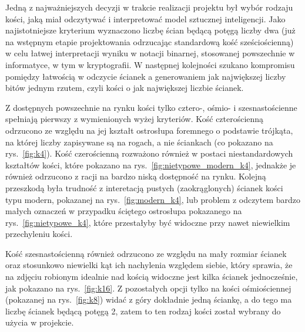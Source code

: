 Jedną z najważniejszych decyzji w trakcie realizacji projektu był wybór rodzaju kości, jaką miał odczytywać
i interpretować model sztucznej inteligencji.
Jako najistotniejsze kryterium wyznaczono liczbę ścian będącą potęgą liczby dwa
(już na wstępnym etapie projektowania odrzucając standardową kość sześciościenną)
w celu łatwej interpretacji wyniku w notacji binarnej, stosowanej powszechnie w informatyce, w tym w kryptografii.
W następnej kolejności szukano kompromisu pomiędzy łatwością w odczycie ścianek a generowaniem jak największej liczby
bitów jednym rzutem, czyli kości o jak największej liczbie ścianek.

Z dostępnych powszechnie na rynku kości tylko cztero-, ośmio- i szesnastościenne spełniają pierwszy z wymienionych wyżej kryteriów.
Kość czterościenną odrzucono ze względu na jej kształt ostrosłupa foremnego o podstawie trójkąta,
na której liczby zapisywane są na rogach, a nie ściankach (co pokazano na rys.~\ref{fig:k4}).
Kość czerościenną rozważono również w postaci niestandardowych kształtów kości, które pokazano na rys.~\ref{fig:nietypowe_modern_k4},
jednakże je również odrzucono z racji na bardzo niską dostępność na rynku. Kolejną przeszkodą była trudność 
z interetacją pustych (zaokrąglonych) ścianek kości typu modern, pokazanej na rys.~\ref{fig:modern_k4},
lub problem z odczytem bardzo małych oznaczeń w przypadku ściętego ostrosłupa pokazanego na rys.~\ref{fig:nietypowe_k4}, 
które przestałyby być widoczne przy nawet niewielkim przechyleniu kości.

Kość szesnastościenną również odrzucono ze względu na mały rozmiar ścianek oraz stosunkowo niewielki kąt ich nachylenia względem siebie,
który sprawia, że na zdjęciu robionym idealnie nad kością widoczne jest kilka ścianek jednocześnie, jak pokazano na rys.~\ref{fig:k16}.
Z pozostałych opcji tylko na kości ośmiościennej (pokazanej na rys.~\ref{fig:k8}) widać z góry dokładnie jedną ściankę,
a do tego ma liczbę ścianek będącą potęgą 2, zatem to ten rodzaj kości został wybrany do użycia w projekcie.

